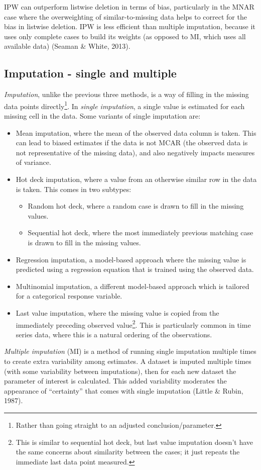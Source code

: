 \documentclass[12pt,twoside]{reedthesis}
\providecommand{\tightlist}{%
  \setlength{\itemsep}{0pt}\setlength{\parskip}{0pt}}
\begin{document}
IPW can outperform listwise deletion in terms of bias, particularly in the MNAR case where the overweighting of similar-to-missing data helps to correct for the bias in listwise deletion. IPW is less efficient than multiple imputation, because it uses only complete cases to build its weights (as opposed to MI, which uses all available data) (Seaman \& White, 2013).

\hypertarget{imputation---single-and-multiple}{%
\subsection{Imputation - single and multiple}\label{imputation---single-and-multiple}}

\emph{Imputation}, unlike the previous three methods, is a way of filling in the missing data points directly\footnote{Rather than going straight to an adjusted conclusion/parameter.}. In \emph{single imputation}, a single value is estimated for each missing cell in the data. Some variants of single imputation are:
\begin{itemize}
\item
  Mean imputation, where the mean of the observed data column is taken. This can lead to biased estimates if the data is not MCAR (the observed data is not representative of the missing data), and also negatively impacts measures of variance.
\item
  Hot deck imputation, where a value from an otherwise similar row in the data is taken. This comes in two subtypes:
  \begin{itemize}
  \tightlist
  \item
    Random hot deck, where a random case is drawn to fill in the missing values.
  \item
    Sequential hot deck, where the most immediately previous matching case is drawn to fill in the missing values.
  \end{itemize}
\item
  Regression imputation, a model-based approach where the missing value is predicted using a regression equation that is trained using the observed data.
\item
  Multinomial imputation, a different model-based approach which is tailored for a categorical response variable.
\item
  Last value imputation, where the missing value is copied from the immediately preceding observed value\footnote{This is similar to sequential hot deck, but last value imputation doesn't have the same concerns about similarity between the cases; it just repeats the immediate last data point measured.}. This is particularly common in time series data, where this is a natural ordering of the observations.
\end{itemize}
\emph{Multiple imputation} (MI) is a method of running single imputation multiple times to create extra variability among estimates. A dataset is imputed multiple times (with some variability between imputations), then for each new dataset the parameter of interest is calculated. This added variability moderates the appearance of ``certainty'' that comes with single imputation (Little \& Rubin, 1987).
\end{document}
